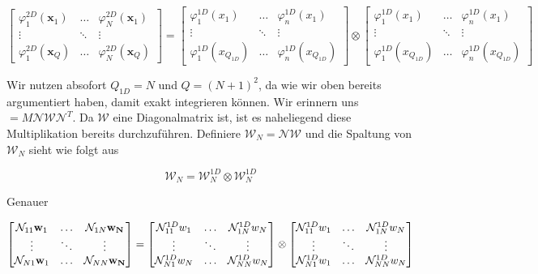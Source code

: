 \begin{equation*}
\begin{bmatrix}
\varphi^{2D}_1(\bm{x}_1) & \hdots & \varphi^{2D}_N(\bm{x}_1) \\
\vdots & \ddots & \vdots \\
\varphi^{2D}_1(\bm{x}_Q) & \hdots & \varphi^{2D}_N(\bm{x}_Q)
\end{bmatrix}
=
\begin{bmatrix}
\varphi^{1D}_1(x_1) & \hdots & \varphi^{1D}_n(x_1) \\
\vdots & \ddots & \vdots \\
\varphi^{1D}_1(x_{Q_{1D}}) & \hdots & \varphi^{1D}_n(x_{Q_{1D}})
\end{bmatrix}
\otimes
\begin{bmatrix}
\varphi^{1D}_1(x_1) & \hdots & \varphi^{1D}_n(x_1) \\
\vdots & \ddots & \vdots \\
\varphi^{1D}_1(x_{Q_{1D}}) & \hdots & \varphi^{1D}_n(x_{Q_{1D}})
\end{bmatrix}
\end{equation*}

Wir nutzen absofort $Q_{1D}=N$ und $Q=(N+1)^2$, da wie wir oben bereits argumentiert haben, damit exakt integrieren können.
Wir erinnern uns $=M\mathcal{N} \mathcal{W} \mathcal{N}^T$. Da $\mathcal{W}$ eine Diagonalmatrix ist, ist es naheliegend diese Multiplikation bereits durchzuführen. Definiere $\mathcal{W}_{N}=\mathcal{N} \mathcal{W}$ und die Spaltung von $\mathcal{W}_N$ sieht wie folgt aus

\begin{equation}
\mathcal{W}_N = \mathcal{W}_N^{1D} \otimes \mathcal{W}_N^{1D}
\end{equation}

Genauer

\begin{equation*}
\begin{bmatrix}
\mathcal{N}_{11} \bold{w}_1 & \hdots & \mathcal{N}_{1N} \bold{w_N} \\
\vdots & \ddots & \vdots \\
\mathcal{N}_{N1} \bold{w}_1 & \hdots & \mathcal{N}_{NN} \bold{w_N}
\end{bmatrix}
= 
\begin{bmatrix}
\mathcal{N}_{11}^{1D} w_1 & \hdots & \mathcal{N}_{1N}^{1D} w_N \\
\vdots & \ddots & \vdots \\
\mathcal{N}_{N1}^{1D} w_N & \hdots & \mathcal{N}_{NN}^{1D} w_N
\end{bmatrix}
\otimes
\begin{bmatrix}
\mathcal{N}_{11}^{1D} w_1 & \hdots & \mathcal{N}_{1N}^{1D} w_N \\
\vdots & \ddots & \vdots \\
\mathcal{N}_{N1}^{1D} w_1 & \hdots & \mathcal{N}_{NN}^{1D}w_N
\end{bmatrix}
\end{equation*}


